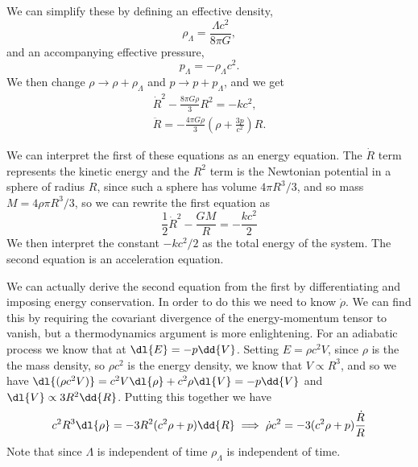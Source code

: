 \documentclass[fleqn]{NotesClass}
\begin{document}
    We can simplify these by defining an effective density,
    \begin{equation}
        \rho_{\Lambda} = \frac{\Lambda c^2}{8\pi G},
    \end{equation}
    and an accompanying effective pressure,
    \begin{equation}
        p_\Lambda = -\rho_\Lambda c^2.
    \end{equation}
    We then change \(\rho \to \rho + \rho_\Lambda\) and \(p \to p + p_\Lambda\), and we get
    \begin{gather}
        \dot{R}^2 - \frac{8\pi G\rho}{3}R^2 = -kc^2,\\
        \ddot{R} = -\frac{4\pi G\rho}{3}\left( \rho + \frac{3p}{c^2} \right)R.
    \end{gather}
    
    We can interpret the first of these equations as an energy equation.
    The \(\dot{R}\) term represents the kinetic energy and the \(R^2\) term is the Newtonian potential in a sphere of radius \(R\), since such a sphere has volume \(4\pi R^3/3\), and so mass \(M = 4\rho\pi R^3/3\), so we can rewrite the first equation as
    \begin{equation}
        \frac{1}{2}\dot{R}^2 - \frac{GM}{R} = -\frac{kc^2}{2}
    \end{equation}
    We then interpret the constant \(-kc^2/2\) as the total energy of the system.
    The second equation is an acceleration equation.
    
    We can actually derive the second equation from the first by differentiating and imposing energy conservation.
    In order to do this we need to know \(\dot{\rho}\).
    We can find this by requiring the covariant divergence of the energy-momentum tensor to vanish, but a thermodynamics argument is more enlightening.
    For an adiabatic process we know that at \(\dl{E} = -p\dd{V}\).
    Setting \(E = \rho c^2V\), since \(\rho\) is the the mass density, so \(\rho c^2\) is the energy density, we know that \(V \propto R^3\), and so we have \(\dl{(\rho c^2V)} = c^2V\dl{\rho} + c^2\rho\dl{V} = -p\dd{V}\) and \(\dl{V} \propto 3R^2\dd{R}\).
    Putting this together we have
    \begin{equation}
        c^2R^3\dl{\rho} = -3R^2(c^2\rho + p)\dd{R} \implies \dot{\rho} c^2 = -3(c^2\rho + p)\frac{\dot{R}}{R}
    \end{equation}
    Note that since \(\Lambda\) is independent of time \(\rho_{\Lambda}\) is independent of time.
    
\end{document}
